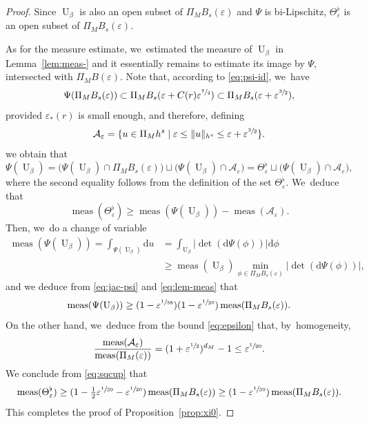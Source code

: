 \documentclass[10pt,a4paper]{amsart}
\theoremstyle{plain}
\theoremstyle{definition}
\DeclareMathOperator{\meas}{meas}
\newcommand{\1}{\mathbf{1}}
\let\epsilon\varepsilon
\begin{document}
\begin{proof}
Since $\operatorname{U}_{\beta}$ is also an open subset of $\Pi_{M}B_{s}(\epsilon)$ and $\Psi$ is bi-Lipschitz, $\Theta_{\epsilon}^{\flat}$ is an open subset of $\Pi_{M}B_{s}(\epsilon)$.

As for the measure estimate, we~estimated the measure of $\operatorname{U}_{\beta}$ in Lemma~\ref{lem:meas-} and it essentially remains to estimate its image by $\Psi$, intersected with $\Pi_{M}B(\epsilon)$.
Note that, according to \eqref{eq:psi-id}, we~have
\[
\Psi(\Pi_{M}B_{s}(\epsilon))\subset \Pi_{M}B_{s}(\epsilon+C(r)\epsilon^{\sfrac{7}{4}})
\subset \Pi_{M}B_{s}(\epsilon+\epsilon^{\sfrac{3}{2}}),
\]
provided $\epsilon_{\ast}(r)$ is small enough, and therefore, defining
\[
\mathcal{A}_{\epsilon} = \{ u\in \Pi_{M}h^{s}\mid \epsilon \leq \|u\|_{h^{s}} \leq \epsilon + \epsilon^{\sfrac{3}{2}}\}.
\]
we obtain that
\[
\Psi(\operatorname{U}_{\beta})
=
\big(
\Psi(\operatorname{U}_{\beta})
\cap
\Pi_{M}B_{s}(\epsilon)
\big)
\sqcup
\big(
\Psi(\operatorname{U}_{\beta})\cap \mathcal{A}_{\epsilon}
\big)
= \Theta_{\epsilon}^{\flat}
\sqcup
\big(
\Psi(\operatorname{U}_{\beta})\cap \mathcal{A}_{\epsilon}
\big),
\]
where the second equality follows from the definition of the set $\Theta_{\epsilon}^{\flat}$. We~deduce that
\begin{equation}
\label{eq:sqcup}
\meas(\Theta_{\epsilon}^{\flat})
\geq
\meas(\Psi(\operatorname{U}_{\beta}))
- \meas(\mathcal{A}_{\epsilon}).
\end{equation}
Then, we~do a change of variable
\[
\begin{split}
\meas(\Psi(\operatorname{U}_{\beta}))
=
\int_{\Psi(\operatorname{U}_{\beta})}
\mathrm{d}u
&=
\int_{\operatorname{U}_{\beta}}
|{\det(\mathrm{d}\Psi(\phi))}|\mathrm{d}\phi \\
&\geq
\meas(\operatorname{U}_{\beta})
\min_{\phi\in \Pi_{M}B_s(\epsilon)}
|{\det(\mathrm{d}\Psi(\phi))}|,
\end{split}
\]
and we deduce from \eqref{eq:jac-psi} and \eqref{eq:lem-meas} that
\[
\meas
(
\Psi(\operatorname{U}_{\beta})
)
\geq
(1-\epsilon^{\sfrac{1}{38}})(1-\epsilon^{\sfrac{1}{20}})\meas(\Pi_{M}B_s(\epsilon)).
\]
On the other hand, we~deduce from the bound \eqref{eq:epsilon} that, by~homogeneity,
\[
\frac{\meas(\mathcal{A}_{\epsilon})}
{\meas(\Pi_{M}(\epsilon))}
=
(1+\epsilon^{\sfrac{1}{2}})^{d_{M}}
-1
\leq \epsilon^{\sfrac{1}{20}}.
\]
We conclude from \eqref{eq:sqcup} that
\[
\meas(\Theta_{\epsilon}^{\flat}) \geq (1-\tfrac{1}{2}\epsilon^{\sfrac{1}{39}}- \epsilon^{\sfrac{1}{20}})\meas(\Pi_{M}B_{s}(\epsilon)) \geq (1-\epsilon^{\sfrac{1}{39}})\meas(\Pi_{M}B_{s}(\epsilon)).
\]
This completes the proof of Proposition~\ref{prop:xi0}.
\end{proof}
\end{document}
